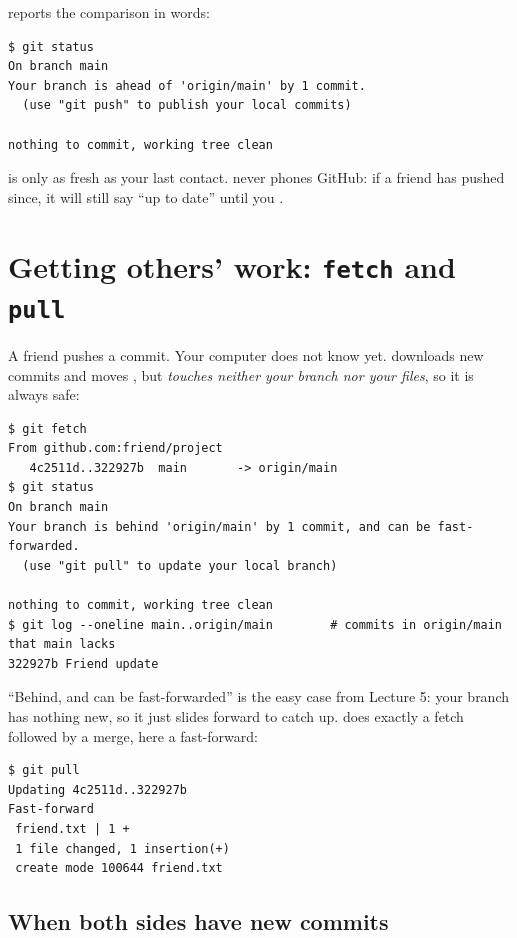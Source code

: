  reports the comparison in words:

\begin{lstlisting}
$ git status
On branch main
Your branch is ahead of 'origin/main' by 1 commit.
  (use "git push" to publish your local commits)

nothing to commit, working tree clean
\end{lstlisting}

\begin{keyidea}
 is only as fresh as your last contact.  never phones GitHub: if a friend has pushed since, it will still say ``up to date'' until you .
\end{keyidea}

\section{Getting others' work: \texttt{fetch} and \texttt{pull}}

A friend pushes a commit. Your computer does not know yet.  downloads new commits and moves , but \emph{touches neither your branch nor your files}, so it is always safe:

\begin{lstlisting}
$ git fetch
From github.com:friend/project
   4c2511d..322927b  main       -> origin/main
$ git status
On branch main
Your branch is behind 'origin/main' by 1 commit, and can be fast-forwarded.
  (use "git pull" to update your local branch)

nothing to commit, working tree clean
$ git log --oneline main..origin/main        # commits in origin/main that main lacks
322927b Friend update
\end{lstlisting}

``Behind, and can be fast-forwarded'' is the easy case from Lecture 5: your branch has nothing new, so it just slides forward to catch up.  does exactly a fetch followed by a merge, here a fast-forward:

\begin{lstlisting}
$ git pull
Updating 4c2511d..322927b
Fast-forward
 friend.txt | 1 +
 1 file changed, 1 insertion(+)
 create mode 100644 friend.txt
\end{lstlisting}

\subsection{When both sides have new commits}

